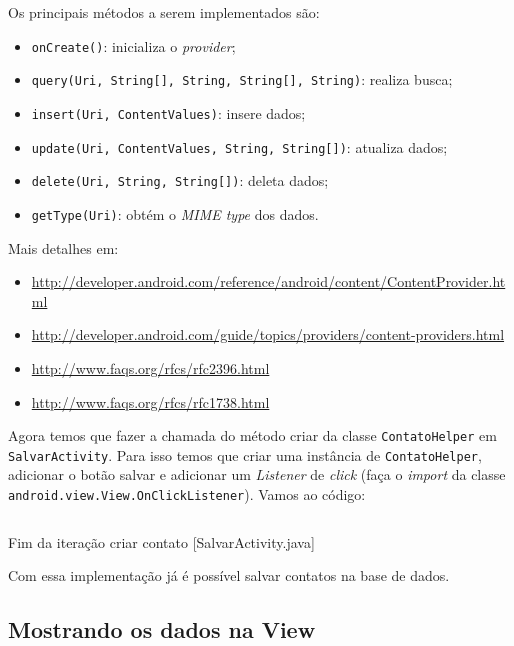 Os principais métodos a serem implementados são:

\begin{itemize}
\item
  \texttt{onCreate()}: inicializa o \emph{provider};
\item
  \texttt{query(Uri, String{[}{]}, String, String{[}{]}, String)}:
  realiza busca;
\item
  \texttt{insert(Uri, ContentValues)}: insere dados;
\item
  \texttt{update(Uri, ContentValues, String, String{[}{]})}: atualiza
  dados;
\item
  \texttt{delete(Uri, String, String{[}{]})}: deleta dados;
\item
  \texttt{getType(Uri)}: obtém o \emph{MIME type} dos dados.
\end{itemize}
Mais detalhes em:

\begin{itemize}
\item
  \url{http://developer.android.com/reference/android/content/ContentProvider.html}
\item
  \url{http://developer.android.com/guide/topics/providers/content-providers.html}
\item
  \url{http://www.faqs.org/rfcs/rfc2396.html}
\item
  \url{http://www.faqs.org/rfcs/rfc1738.html}
\end{itemize}
 Agora temos que fazer a chamada do método criar da classe
\texttt{ContatoHelper} em \texttt{SalvarActivity}. Para isso temos que
criar uma instância de \texttt{ContatoHelper}, adicionar o botão salvar
e adicionar um \emph{Listener} de \emph{click} (faça o \emph{import} da
classe \newline
\texttt{android.view.View.OnClickListener}). Vamos ao código:

\begin{listing}[H]
  \inputminted[linenos=true,frame=bottomline,tabsize=3]{ java }{ source/SalvarActivity-2.java }
  \caption{Fim da iteração criar contato [SalvarActivity.java]}
\end{listing}

Com essa implementação já é possível salvar contatos na base de dados.

\subsection{Mostrando os dados na View \label{ssec:listview}}

